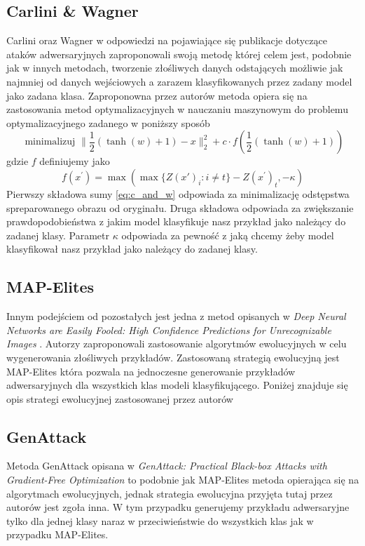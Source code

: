 \documentclass{article}
\begin{document}
\subsection{Carlini \& Wagner}
Carlini oraz Wagner\cite{DBLP:journals/corr/CarliniW16a} w odpowiedzi na pojawiające się publikacje dotyczące
ataków adwersaryjnych zaproponowali swoją metodę której celem jest, podobnie jak w innych metodach,
tworzenie złośliwych danych
odstających możliwie jak najmniej od danych wejściowych a zarazem klasyfikowanych przez zadany model jako
zadana klasa. Zaproponowna przez autorów metoda opiera się na zastosowania metod optymalizacyjnych  w nauczaniu
maszynowym do problemu optymalizacyjnego zadanego w poniższy sposób
\begin{equation}\label{eq:c_and_w}
    \text { minimalizuj } \| \frac { 1 } { 2 } ( \tanh ( w ) + 1 ) - x \| _ { 2 } ^ { 2 } + c \cdot f ( \frac { 1 } { 2 } ( \tanh ( w ) + 1 ) )
\end{equation}
gdzie $f$ definiujemy jako
\begin{equation}
    f ( x ^ { \prime } ) = \max ( \max \{ Z ( x' ) _ { i } : i \neq t \} - Z ( x ^ { \prime } ) _ { t } , - \kappa)
\end{equation}
Pierwszy składowa sumy \eqref{eq:c_and_w} odpowiada za minimalizację odstępstwa spreparowanego obrazu
od oryginału. Druga składowa odpowiada za zwiększanie prawdopodobieństwa z jakim model klasyfikuje nasz przykład
jako należący do zadanej klasy. Parametr \(\kappa\) odpowiada za pewność z jaką chcemy żeby model klasyfikował nasz
przykład jako należący do zadanej klasy.


\subsection{MAP-Elites}
Innym podejściem od pozostałych jest jedna z metod opisanych w
\textit{Deep Neural Networks are Easily Fooled: High Confidence Predictions for Unrecognizable Images} \cite{DBLP:journals/corr/NguyenYC14}.
Autorzy zaproponowali zastosowanie algorytmów ewolucyjnych w celu wygenerowania złośliwych przykładów.
Zastosowaną strategią ewolucyjną jest MAP-Elites która pozwala na jednoczesne generowanie przykładów adwersaryjnych dla
wszystkich klas modeli klasyfikującego. Poniżej znajduje się opis strategi ewolucyjnej zastosowanej przez autorów

\subsection{GenAttack}
Metoda GenAttack opisana w
\textit{GenAttack: Practical Black-box Attacks with Gradient-Free Optimization}\cite{DBLP:journals/corr/abs-1805-11090}
to podobnie jak MAP-Elites metoda opierająca się na algorytmach ewolucyjnych, jednak strategia ewolucyjna
przyjęta tutaj przez autorów jest zgoła inna. W tym przypadku generujemy przykładu adwersaryjne tylko dla jednej klasy naraz
w przeciwieństwie do wszystkich klas jak w przypadku MAP-Elites.
\end{document}
